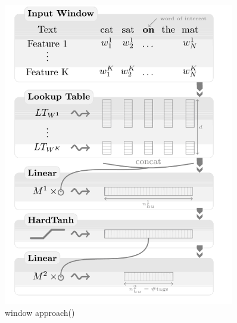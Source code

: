 \begin{figure}[H]
\centering
\begin{minipage}{.5\textwidth}
 
	\includegraphics[width=0.9\textwidth]{cw1} 
	\caption{window approach(\cite{CollobertWestonEtAl2011})}
	\label{fig:cw1}
\end{minipage}%
\begin{minipage}{.5\textwidth}
  

\end{minipage}
\end{figure}
